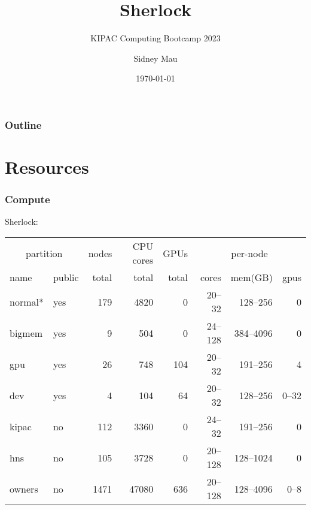 \documentclass[aspectratio=169]{beamer}
\title{Sherlock}
\subtitle{KIPAC Computing Bootcamp 2023}
\author[S. Mau]{Sidney Mau}
\institute[Stanford]{Stanford University}
\date[\today]{\today}
\begin{document}

\frame{\titlepage}

\begin{frame}
	\frametitle{Outline}
	\tableofcontents
\end{frame}


\section{Resources}

\frame{\sectionpage}

\begin{frame}
	\frametitle{Compute}
	Sherlock:
	\begin{center}
		\begin{tabular}{|l|l||r|r|r||r|r|r|}
			\hline
			\multicolumn{2}{|c||}{partition} & nodes & CPU cores & GPUs & \multicolumn{3}{|c|}{per-node} \\
			 name      &  public & total &     total & total &  cores &  mem(GB) & gpus \\
			\hline
			 normal*   &  yes    &   179 &      4820 &     0 &  20--32 &  128--256 &    0 \\
			 bigmem    &  yes    &     9 &       504 &     0 & 24--128 & 384--4096 &    0 \\
			 gpu       &  yes    &    26 &       748 &   104 &  20--32 &  191--256 &    4 \\
			 dev       &  yes    &     4 &       104 &    64 &  20--32 &  128--256 & 0--32 \\
			\hline
			 kipac     &  no     &   112 &      3360 &     0 &  24--32 &  191--256 &    0 \\
			 hns       &  no     &   105 &      3728 &     0 & 20--128 & 128--1024 &    0 \\
			\hline
			 owners    &  no     &  1471 &     47080 &   636 & 20--128 & 128--4096 &  0--8 \\
			\hline
		\end{tabular}

\end{center}
\end{frame}
\end{document}
